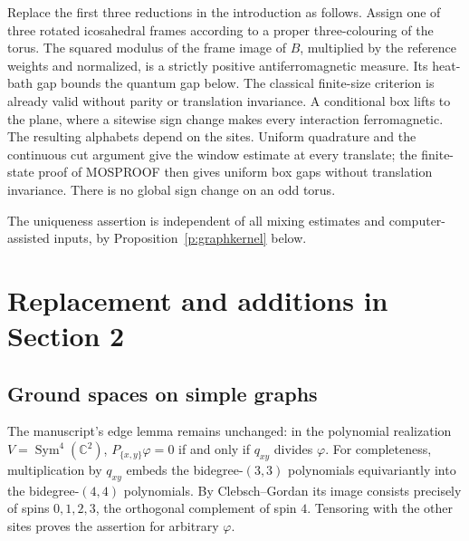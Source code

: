 \documentclass[11pt,reqno]{amsart}
\theoremstyle{definition}
\newcommand{\C}{\mathbb C}
\begin{document}
Replace the first three reductions in the introduction as follows.
Assign one of three rotated icosahedral frames according to a proper
three-colouring of the torus. The squared modulus of the frame image of
$B$, multiplied by the reference weights and normalized, is a strictly
positive antiferromagnetic measure. Its heat-bath gap bounds the quantum
gap below. The classical finite-size criterion is already valid without
parity or translation invariance. A conditional box lifts to the plane,
where a sitewise sign change makes every interaction ferromagnetic.
The resulting alphabets depend on the sites. Uniform quadrature and the
continuous cut argument give the window estimate at every translate;
the finite-state proof of MOSPROOF then gives uniform box gaps without
translation invariance. There is no global sign change on an odd torus.

The uniqueness assertion is independent of all mixing estimates and
computer-assisted inputs, by Proposition~\ref{p:graphkernel} below.

\section{Replacement and additions in Section 2}
\label{s:frames}

\subsection{Ground spaces on simple graphs}

The manuscript's edge lemma remains unchanged: in the polynomial
realization $V=\operatorname{Sym}^4(\C^2)$,
$P_{\{x,y\}}\varphi=0$ if and only if $q_{xy}$ divides $\varphi$.
For completeness, multiplication by $q_{xy}$ embeds the bidegree-$(3,3)$
polynomials equivariantly into the bidegree-$(4,4)$ polynomials. By
Clebsch--Gordan its image consists precisely of spins $0,1,2,3$, the
orthogonal complement of spin $4$. Tensoring with the other sites proves
the assertion for arbitrary $\varphi$.
\end{document}
